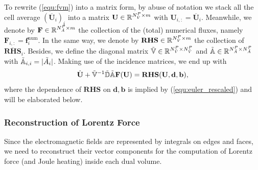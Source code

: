 \documentclass{article}
\begin{document}
To rewrite (\ref{equ:fvm}) into a matrix form, by abuse of notation we stack all the cell average $(\overline{\mathbf{U}}_i)_i$ into a matrix $\mathbf{U} \in \mathbb{R}^{N_{\Tilde{V}}^P \times m}$ with $\mathbf{U}_{i,:} = \overline{\mathbf{U}}_i$. Meanwhile, we denote by $\mathbf{F} \in \mathbb{R}^{N_{\Tilde{A}}^P \times m}$ the collection of the (total) numerical fluxes, namely $\mathbf{F}_{i,:} = \mathbf{f}^\text{num}_i$. In the same way, we denote by $\mathbf{RHS}\in \mathbb{R}^{N_{\Tilde{V}}^P \times m}$ the collection of $\overline{\mathbf{RHS}}_i$. Besides, we define the diagonal matrix $\mathbb{\Tilde{V}} \in \mathbb{R}^{N_{\Tilde{V}}^P \times N_{\Tilde{V}}^P}$ and $\mathbb{\Tilde{A}}\in \mathbb{R}^{N_{\Tilde{A}}^P \times N_{\Tilde{A}}^P}$ with $\mathbb{\Tilde{A}}_{i,i} = |\Tilde{A}_i|$. Making use of the incidence matrices, we end up with
\begin{equation*}
    \dot{\mathbf{U}} + \mathbb{\Tilde{V}}^{-1}\mathbb{\Tilde{D}}\mathbb{\Tilde{A}}\mathbf{F}(\mathbf{U})  = \mathbf{RHS}(\mathbf{U},\mathbf{d},\mathbf{b}),
\end{equation*}
where the dependence of $\mathbf{RHS}$ on $\mathbf{d}, \mathbf{b}$ is implied by (\ref{equ:euler_rescaled}) and will be elaborated below.

\subsubsection{Reconstruction of Lorentz Force}
Since the electromagnetic fields are represented by integrals on edges and faces, we need to reconstruct their vector components for the computation of Lorentz force (and Joule heating) inside each dual volume.    
\end{document}
